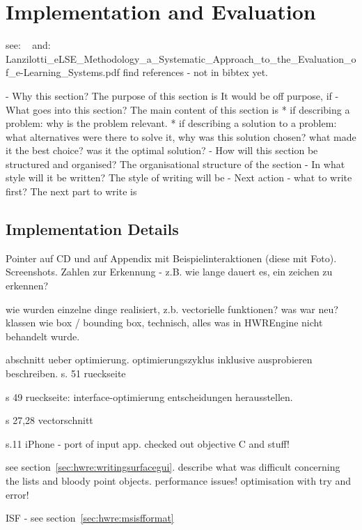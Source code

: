 
\chapter{Implementation and Evaluation}
\label{chap:implementationevaluation}

see: ~
and: Lanzilotti_eLSE_Methodology_a_Systematic_Approach_to_the_Evaluation_of_e-Learning_Systems.pdf
find references - not in bibtex yet.

- Why this section? 
  The purpose of this section is 
  It would be off purpose, if 
- What goes into this section?
  The main content of this section is 
  * if describing a problem: why is the problem relevant.
  * if describing a solution to a problem: what alternatives were
    there to solve it, why was this solution chosen? 
    what made it the best choice? was it the optimal solution?
- How will this section be structured and organised?
  The organisational structure of the section 
- In what style will it be written?
  The style of writing will be 
- Next action - what to write first?
  The next part to write is

\section{Implementation Details}
Pointer auf CD und auf Appendix mit Beispielinteraktionen (diese mit Foto).
Screenshots.
Zahlen zur Erkennung - z.B. wie lange dauert es, ein zeichen zu erkennen?

wie wurden einzelne dinge realisiert, z.b. vectorielle funktionen?
was war neu?
klassen wie box / bounding box, technisch, alles was in HWREngine nicht behandelt
wurde.

abschnitt ueber optimierung.
optimierungszyklus inklusive ausprobieren beschreiben.
s. 51 rueckseite

s 49 rueckseite: interface-optimierung
entscheidungen herausstellen. 

s 27,28 vectorschnitt

s.11 iPhone - port of input app. checked out objective C and stuff!

see section~\ref{sec:hwre:writingsurfacegui}. describe what was difficult concerning the lists and bloody point objects.
performance issues! optimisation with try and error!

ISF - see section~\ref{sec:hwre:msisfformat}

